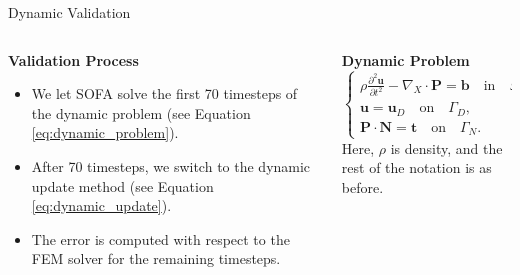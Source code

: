 \documentclass[9pt]{beamer}
\begin{document}
\begin{frame}{Dynamic Validation}
    \begin{columns}[T]
        \begin{column}{0.5\textwidth}
            \textbf{Validation Process}
            \begin{itemize}
                \item We let SOFA solve the first 70 timesteps of the dynamic problem (see Equation \ref{eq:dynamic_problem}).
                \item After 70 timesteps, we switch to the dynamic update method (see Equation \ref{eq:dynamic_update}).
                \item The error is computed with respect to the FEM solver for the remaining timesteps.
            \end{itemize}
        \end{column}
        \begin{column}{0.5\textwidth}
            \textbf{Dynamic Problem}
            \begin{equation}
                \begin{cases}
                    \rho \frac{\partial^2 \bm{u}}{\partial t^2} - \nabla_X \cdot \bm{P} = \bm{b} \quad \text{in} \quad \Omega, \\
                    \bm{u} = \bm{u}_D \quad \text{on} \quad \Gamma_D, \\
                    \bm{P} \cdot \bm{N} = \bm{t} \quad \text{on} \quad \Gamma_N.
                \end{cases}
                \label{eq:dynamic_problem}
            \end{equation}
            Here, \(\rho\) is density, and the rest of the notation is as before.
        \end{column}
    \end{columns}
\end{frame}
\end{document}
